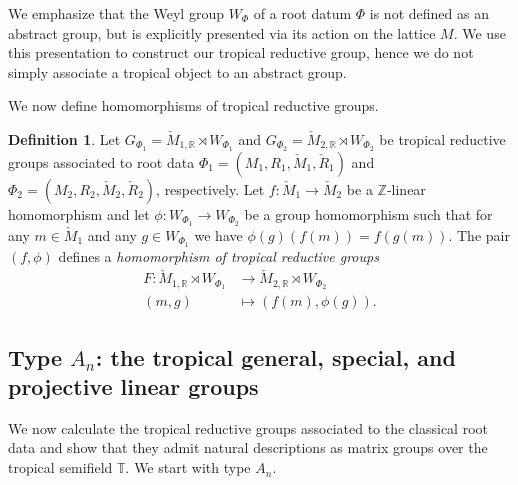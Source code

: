 \documentclass[10pt, a4paper]{amsart}
\theoremstyle{definition}
\newtheorem{definition}[theorem]{Definition}
\theoremstyle{myitemstyle}
\newcommand{\ZZ}{\mathbb{Z}}
\newcommand{\RR}{\mathbb{R}}
\newcommand{\TT}{\mathbb{T}}
\newcommand{\Mcheck}{{\check{M}}}
\newcommand{\Rcheck}{\check{R}}
\begin{document}
We emphasize that the Weyl group $W_{\Phi}$ of a root datum $\Phi$ is not defined as an abstract group, but is explicitly presented via its action on the lattice $M$. We use this presentation to construct our tropical reductive group, hence we do not simply associate a tropical object to an abstract group.

We now define homomorphisms of tropical reductive groups. 


\begin{definition} Let $G_{\Phi_1}=\Mcheck_{1,\RR}\rtimes W_{\Phi_1}$ and $G_{\Phi_2}=\Mcheck_{2,\RR}\rtimes W_{\Phi_2}$ be tropical reductive groups associated to root data $\Phi_1=(M_1,R_1,\Mcheck_1,\Rcheck_1)$ and $\Phi_2=(M_2,R_2,\Mcheck_2,\Rcheck_2)$, respectively. Let $f:\Mcheck_1\to \Mcheck_2$ be a $\ZZ$-linear homomorphism and let $\phi:W_{\Phi_1}\to W_{\Phi_2}$ be a group homomorphism such that for any $m \in \Mcheck_1$ and any $g\in W_{\Phi_1}$ we have $\phi(g)(f(m))=f(g(m))$. The pair $(f,\phi)$ defines a \emph{homomorphism of tropical reductive groups}
\begin{equation*}\begin{split}
    F:\Mcheck_{1,\RR}\rtimes W_{\Phi_1}&\longrightarrow \Mcheck_{2,\RR}\rtimes W_{\Phi_2}\\
    (m,g)&\longmapsto(f(m),\phi(g)).
\end{split}\end{equation*}
\label{def:homomorphism}
\end{definition}













\subsection{Type $A_n$: the tropical general, special, and projective linear groups} We now calculate the tropical reductive groups associated to the classical root data and show that they admit natural descriptions as matrix groups over the tropical semifield $\TT$. We start with type $A_n$.
\end{document}
